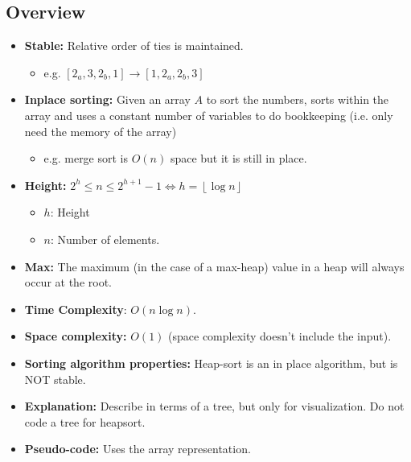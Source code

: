 \documentclass{article}
\begin{document}
\subsection{Overview}
\begin{summary}
    \begin{itemize}
        \item \textbf{Stable:} Relative order of ties is maintained.
        \begin{itemize}
            \item e.g. $[2_a,3,2_b,1]\rightarrow [1,2_a,2_b,3]$
        \end{itemize}
        \item \textbf{Inplace sorting:} Given an array \( A \) to sort the numbers, sorts within the array and uses a constant number of variables to do bookkeeping (i.e. only need the memory of the array)
        \begin{itemize}
            \item e.g. merge sort is $O(n)$ space but it is still in place.
        \end{itemize}
    \end{itemize}
\end{summary}

\begin{intuition}
    \begin{itemize}
        \item \textbf{Height:} $2^h \leq n \leq 2^{h+1} - 1 \iff h = \left\lfloor \log n \right\rfloor $
        \begin{itemize}
            \item $h$: Height
            \item $n$: Number of elements.
        \end{itemize}
        \item \textbf{Max:} The maximum (in the case of a max-heap) value in a heap will always occur at the root.
        \item \textbf{Time Complexity}: \( O(n \log n) \).
        \item \textbf{Space complexity:} $O(1)$ (space complexity doesn't include the input).
        \item \textbf{Sorting algorithm properties:} Heap-sort is an in place algorithm, but is NOT stable.
        \item \textbf{Explanation:} Describe in terms of a tree, but only for visualization. Do not code a tree for heapsort.
        \item \textbf{Pseudo-code:} Uses the array representation.
    \end{itemize}
\end{intuition}
\end{document}
